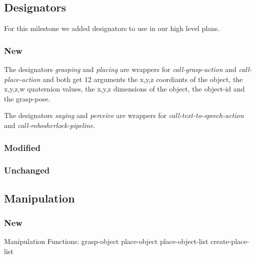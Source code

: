 \documentclass[main.tex]{subfiles}
\begin{document}
                \subsection{Designators}
                For this milestone we added designators to use in our high level plans.
                \subsubsection{New} 
                The designators \textit {grasping} and \textit {placing} are wrappers for \textit {call-grasp-action} and \textit {call-place-action} and both get 12 arguments the x,y,z coordiants of the object, the x,y,z,w quaternion values, the x,y,z dimensions of the object, the object-id and the grasp-pose. 
                
                The designators \textit {saying} and \textit {perceive} are wrappers for \textit {call-text-to-speech-action} and \textit {call-robosherlock-pipeline}. 

                \subsubsection{Modified}
                \subsubsection{Unchanged}
                
                \subsection{Manipulation}
                \subsubsection{New}
                Manipulation Functions:
                grasp-object
                place-object
                place-object-list
                create-place-list
                
                
                
\end{document}
